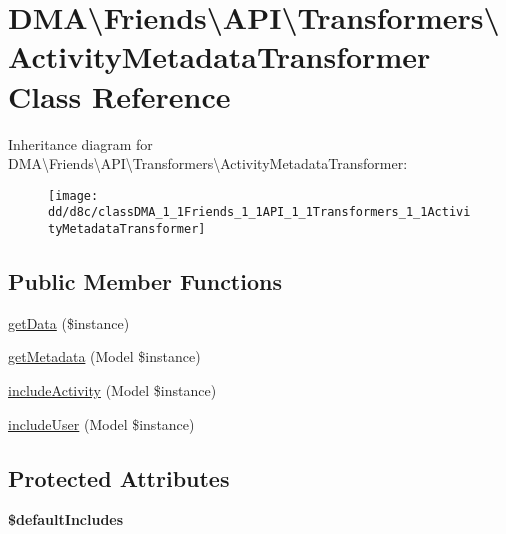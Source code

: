\hypertarget{classDMA_1_1Friends_1_1API_1_1Transformers_1_1ActivityMetadataTransformer}{}\section{D\+M\+A\textbackslash{}Friends\textbackslash{}A\+P\+I\textbackslash{}Transformers\textbackslash{}Activity\+Metadata\+Transformer Class Reference}
\label{classDMA_1_1Friends_1_1API_1_1Transformers_1_1ActivityMetadataTransformer}
Inheritance diagram for D\+M\+A\textbackslash{}Friends\textbackslash{}A\+P\+I\textbackslash{}Transformers\textbackslash{}Activity\+Metadata\+Transformer\+:\begin{figure}[H]
\begin{center}
\leavevmode
\texttt{[image: dd/d8c/classDMA\_1\_1Friends\_1\_1API\_1\_1Transformers\_1\_1ActivityMetadataTransformer]}
\end{center}
\end{figure}
\subsection*{Public Member Functions}
\begin{DoxyCompactItemize}
\item 
\hyperlink{classDMA_1_1Friends_1_1API_1_1Transformers_1_1ActivityMetadataTransformer_af1bd0fda73868743295a18510d0b507c}{get\+Data} (\$instance)
\item 
\hyperlink{classDMA_1_1Friends_1_1API_1_1Transformers_1_1ActivityMetadataTransformer_a699e499e8abef3facc46bb99e4ceacf3}{get\+Metadata} (Model \$instance)
\item 
\hyperlink{classDMA_1_1Friends_1_1API_1_1Transformers_1_1ActivityMetadataTransformer_a38bfe7aab17cf0599631c2c6c1b3fca7}{include\+Activity} (Model \$instance)
\item 
\hyperlink{classDMA_1_1Friends_1_1API_1_1Transformers_1_1ActivityMetadataTransformer_a863325b774ddcfde7616686a3e0527bb}{include\+User} (Model \$instance)
\end{DoxyCompactItemize}
\subsection*{Protected Attributes}
\begin{DoxyCompactItemize}
\item 
{\bfseries \$default\+Includes}
\end{DoxyCompactItemize}
